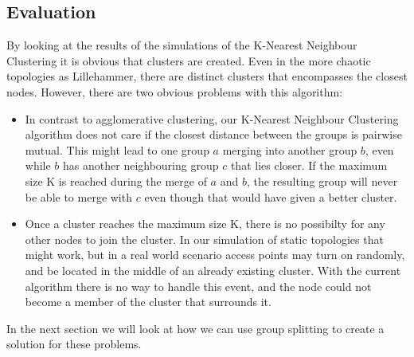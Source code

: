 %

\subsection{Evaluation}
By looking at the results of the simulations of the K-Nearest Neighbour Clustering it is obvious that clusters are created.  Even in the more chaotic topologies as Lillehammer,
there are distinct clusters that encompasses the closest nodes. However, there are two obvious problems with this algorithm:
\begin{itemize}
	\item In contrast to agglomerative clustering, our K-Nearest Neighbour Clustering algorithm does not care if the closest distance between the groups is pairwise mutual. This
		might lead to one group $a$ merging into another group $b$, even while $b$ has another neighbouring group $c$ that lies closer. If the maximum size K is reached during the merge of
		$a$ and $b$,  the resulting group will never be able to merge with $c$ even though that would have given a better cluster. 
	\item Once a cluster reaches the maximum size K, there is no possibilty for any other nodes to join the cluster.
		In our simulation of static topologies that might work, but in a real world scenario access points may turn on randomly, and be located in the middle of an already existing cluster.
		With the current algorithm there is no way to handle this event, and the node could not become a member of the cluster that surrounds it. 
\end{itemize}

In the next section we will look at how we can use group splitting to create a solution for these problems. 



